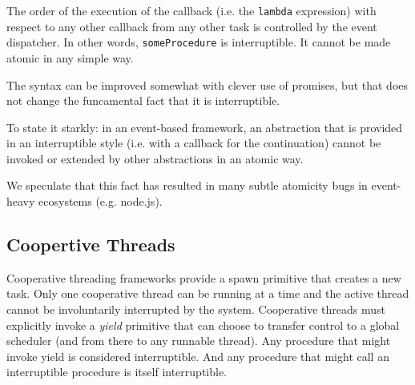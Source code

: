 \documentclass[9pt,preprint]{sigplanconf}
\begin{document}
The order of the execution of the callback (i.e. the \texttt{lambda} expression) with  respect to any other callback from any other task is controlled by the event dispatcher.
In other words, \texttt{someProcedure} is interruptible.
It cannot be made atomic in any simple way.

The syntax can be improved somewhat with clever use of promises, but that does not change the funcamental fact that it is interruptible.

To state it starkly: in an event-based framework, an abstraction that is provided in an interruptible style (i.e. with a callback for the continuation) cannot be invoked or extended by other abstractions in an atomic way.

We speculate that this fact has resulted in many subtle atomicity bugs in event-heavy ecosystems (e.g. node.js).

\subsection{Coopertive Threads}




Cooperative threading frameworks provide a spawn primitive that creates a new task.
Only one cooperative thread can be running at a time and the active thread cannot be involuntarily interrupted by the system.
Cooperative threads must explicitly invoke a \emph{yield} primitive that can choose to transfer control to a global scheduler (and from there to any runnable thread).
Any procedure that might invoke yield is considered interruptible.
And any procedure that might call an interruptible procedure is itself interruptible.
\end{document}
